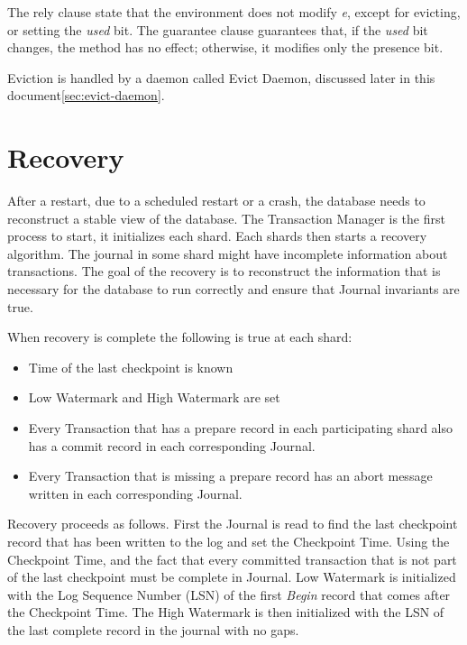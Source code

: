 \documentclass[twoside]{article}
\begin{document}
The rely clause state that the environment does not modify \emph{e}, except for 
evicting, or setting the \emph{used} bit.
The guarantee clause guarantees that, if the \emph{used} bit changes, the method has 
no effect; otherwise, it modifies only the presence bit.

Eviction is handled by a daemon called Evict Daemon, discussed later in this
document\ref{sec:evict-daemon}.

\section{Recovery}
\label{sec:recovery}

After a restart, due to a scheduled restart or a crash, the database needs to 
reconstruct a stable view of the database. 
The Transaction Manager is the first process to start, it initializes each shard.
Each shards then starts a recovery algorithm.
The journal in some shard might have incomplete information 
about transactions. 
The goal of the recovery is to reconstruct the information
that is necessary for the database to run correctly and ensure that Journal 
invariants are true.


When recovery is complete the following is true at each shard:
\begin{itemize}
  \item Time of the last checkpoint is known
  \item Low Watermark and High Watermark are set
  \item Every Transaction that has a prepare record in each participating shard also
  has a commit record in each corresponding Journal.
  \item Every Transaction that is missing a prepare record has an abort message 
  written in each corresponding Journal.
\end{itemize}

Recovery proceeds as follows. 
First the Journal is read to find the last checkpoint record that has been written
to the log and set the Checkpoint Time.
Using the Checkpoint Time, and the fact that every committed transaction that is 
not part of the last checkpoint must be complete in Journal.
Low Watermark is initialized with the Log Sequence Number (LSN) of the first 
\textit{Begin} record that comes after the Checkpoint Time. 
The High Watermark is then initialized with the LSN of the last complete 
record in the journal with no gaps.
\end{document}
